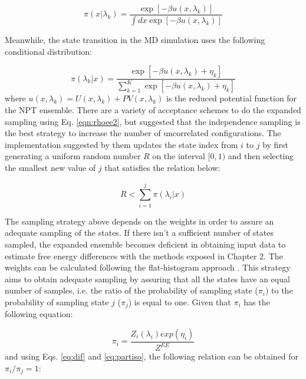 	\begin{equation}
	\pi(x|\lambda_{k}) = \dfrac{\exp[-\beta u(x,\lambda_{k})]}{\int dx \exp [- \beta u(x,\lambda_{k})]}
	\label{eqn:rhoee1}
	\end{equation} 
	
	Meanwhile, the state transition in the MD simulation uses the following conditional distribution:
	
	\begin{equation}
	\pi(\lambda_{k}|x) = \dfrac{\exp[-\beta u(x,\lambda_{k}) + \eta_{k}]}{ \sum_{k=1}^{K} \exp [- \beta u(x,\lambda_{k})+ \eta_{k}]}
	\label{eqn:rhoee2}
	\end{equation} 
	where $u(x,\lambda_{k}) = U(x,\lambda_{k}) + PV(x,\lambda_{k})$ is the reduced potential function for the NPT ensemble. There are a variety of acceptance schemes to do the expanded sampling using Eq. \eqref{eqn:rhoee2}, but  suggested that the independence sampling \cite{liu2002} is the best strategy to increase the number of uncorrelated configurations. The implementation suggested by them updates the state index from $i$ to $j$ by first generating a uniform random number $R$ on the interval $[0,1)$ and then selecting the smallest new value of $j$ that satisfies  the relation below:
	
	\begin{equation}
	R < \sum_{i=1}^{j} \pi(\lambda_{i}|x) 
	\label{eqn:relee2}
	\end{equation} 
	
	The sampling strategy above depends on the weights in order to assure an adequate sampling of the states. If there isn't a sufficient number of states sampled, the expanded ensemble becomes deficient in obtaining input data to estimate free energy differences with the methods exposed in Chapter 2. The weights can be calculated following the flat-histogram approach \cite{bernd1992,bernd1993,dayal2004}. This strategy aims to obtain adequate sampling by assuring that all the states have an equal number of samples, i.e. the ratio of the probability of sampling state ($\pi_{i}$) to the probability of sampling state $j$ ($\pi_{j}$) is equal to one. Given that $\pi_{i}$ has the following equation:
	
	\begin{equation}
	\pi_{i} = \dfrac{Z_{i}(\lambda_{i}) exp(\eta_{i})}{Z^{EE}} 
	\label{eqn:wei1}
	\end{equation} 
	and using Eqs. \ref{eq:dif} and \ref {eq:partiso}, the following relation can be obtained for $\pi_{i}/\pi_{j}=1$:
	
